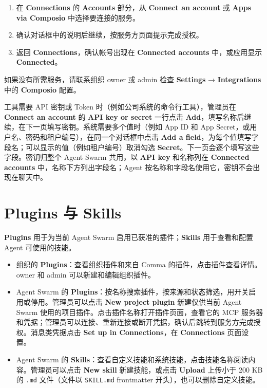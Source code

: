 \documentclass[UTF8,a4paper,11pt]{ctexart}
\begin{document}
\begin{enumerate}
  \item 在 \textbf{Connections} 的 \textbf{Accounts} 部分，从 \textbf{Connect an account} 或 \textbf{Apps via Composio} 中选择要连接的服务。
  \item 确认对话框中的说明后继续，按服务方页面提示完成授权。
  \item 返回 \textbf{Connections}，确认帐号出现在 \textbf{Connected accounts} 中，或应用显示 \textbf{Connected}。
\end{enumerate}

如果没有所需服务，请联系组织 owner 或 admin 检查 \textbf{Settings} → \textbf{Integrations} 中的 \textbf{Composio} 配置。

工具需要 API 密钥或 Token 时（例如公司系统的命令行工具），管理员在 \textbf{Connect an account} 的 \textbf{API key or secret} 一行点击 \textbf{Add}，填写名称后继续，在下一页填写密钥。系统需要多个值时（例如 App ID 和 App Secret，或用户名、密码和租户编号），在同一个对话框中点击 \textbf{Add a field}，为每个值填写字段名；可以显示的值（例如租户编号）取消勾选 \textbf{Secret}。下一页会逐个填写这些字段。密钥归整个 Agent Swarm 共用，以 \textbf{API key} 和名称列在 \textbf{Connected accounts} 中，名称下方列出字段名；Agent 按名称和字段名使用它，密钥不会出现在聊天中。

\section{Plugins 与 Skills}

\textbf{Plugins} 用于为当前 Agent Swarm 启用已获准的插件；\textbf{Skills} 用于查看和配置 Agent 可使用的技能。

\begin{itemize}
  \item 组织的 \textbf{Plugins}：查看组织插件和来自 Comma 的插件，点击插件查看详情。owner 和 admin 可以新建和编辑组织插件。
  \item Agent Swarm 的 \textbf{Plugins}：按名称搜索插件，按来源和状态筛选，用开关启用或停用。管理员可以点击 \textbf{New project plugin} 新建仅供当前 Agent Swarm 使用的项目插件。点击插件名称打开插件页面，查看它的 MCP 服务器和凭据；管理员可以连接、重新连接或断开凭据，确认后跳转到服务方完成授权。消息类凭据点击 \textbf{Set up in Connections}，在 \textbf{Connections} 页面设置。
  \item Agent Swarm 的 \textbf{Skills}：查看自定义技能和系统技能，点击技能名称阅读内容。管理员可以点击 \textbf{New skill} 新建技能，或点击 \textbf{Upload} 上传小于 200 KB 的 \texttt{.md} 文件（文件以 \texttt{SKILL.md} frontmatter 开头），也可以删除自定义技能。
\end{itemize}
\end{document}
